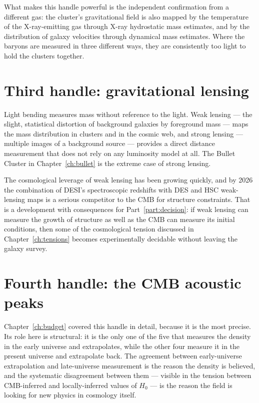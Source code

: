 What makes this handle powerful is the independent confirmation from a
different gas: the cluster's gravitational field is also mapped by the
temperature of the X-ray-emitting gas through X-ray hydrostatic mass
estimates, and by the distribution of galaxy velocities through dynamical
mass estimates. Where the baryons are measured in three different ways, they
are consistently too light to hold the clusters together.

\section{Third handle: gravitational lensing}Light bending measures mass without reference to the light.
Weak lensing --- the slight, statistical distortion of background galaxies
by foreground mass --- maps the mass distribution in clusters and in the
cosmic web, and strong lensing --- multiple images of a background source ---
provides a direct distance measurement that does not rely on any luminosity
model at all. The Bullet Cluster in Chapter~\ref{ch:bullet} is the extreme
case of strong lensing.

The cosmological leverage of weak lensing has been growing quickly, and by
2026 the combination of DESI's spectroscopic redshifts with DES and HSC
weak-lensing maps is a serious competitor to the CMB for structure
constraints. That is a development with consequences for Part~\ref{part:decision}:
if weak lensing can measure the growth of structure as well as the CMB can
measure its initial conditions, then some of the cosmological tension
discussed in Chapter~\ref{ch:tensions} becomes experimentally decidable
without leaving the galaxy survey.

\section{Fourth handle: the CMB acoustic peaks}Chapter~\ref{ch:budget} covered this handle in detail, because it is
the most precise. Its role here is structural: it is the only one of the
five that measures the density in the early universe and extrapolates, while
the other four measure it in the present universe and extrapolate back.
The agreement between early-universe extrapolation and late-universe
measurement is the reason the density is believed, and the systematic
disagreement between them --- visible in the tension between CMB-inferred
and locally-inferred values of $H_0$ --- is the reason the field is looking
for new physics in cosmology itself.

